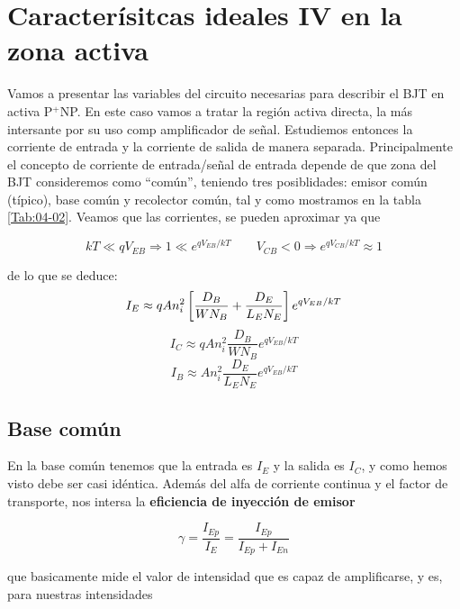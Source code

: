 \section{Caracterísitcas ideales IV en la zona activa}

Vamos a presentar las variables del circuito necesarias para describir el BJT en activa P$^+$NP. En este caso vamos a tratar la región activa directa, la más intersante por su uso comp amplificador de señal. Estudiemos entonces la corriente de entrada y la corriente de salida de manera separada. Principalmente el concepto de corriente de entrada/señal de entrada depende de que zona del BJT consideremos como ``común'', teniendo tres posiblidades: emisor común (típico), base común y recolector común, tal y como mostramos en la tabla \cref{Tab:04-02}. Veamos que las corrientes, se pueden aproximar ya que 

\begin{equation}
    kT \ll qV_{EB}\Longrightarrow 1 \ll e^{qV_{EB}/kT}\qquad V_{CB} < 0 \Longrightarrow e^{qV_{CB}/kT} \approx 1
\end{equation}

de lo que se deduce: 
\begin{equation}
    I_E \approx q A n_i^2 \left[ \frac{D_B}{WN_B} + \frac{D_E}{L_EN_E} \right] e^{qV_{EB}/kT}
\end{equation}
\begin{equation}
    I_C \approx q A n_i^2 {\frac{D_B}{WN_B}} e^{qV_{EB}/kT}
\end{equation}
\begin{equation}
    I_B \approx  A n_i^2 \frac{D_E}{L_EN_E}  e^{qV_{EB}/kT}
\end{equation}


\subsection{Base común}

En la base común tenemos que la entrada es $I_E$ y la salida es $I_C$, y como hemos visto debe ser casi idéntica. Además del alfa de corriente continua y el factor de transporte, nos intersa la  \textbf{eficiencia de inyección de emisor} 

\begin{equation}
    \gamma = \frac{I_{Ep}}{I_E} = \frac{I_{Ep}}{I_{Ep} + I_{En}}
\end{equation}

que basicamente mide el valor de intensidad que es capaz de amplificarse, y es, para nuestras intensidades

